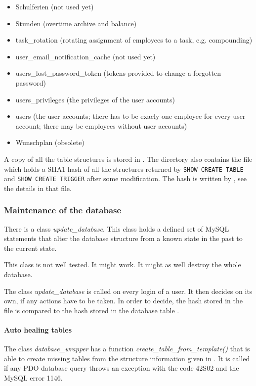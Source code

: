 \begin{itemize}
\item Schulferien (not used yet)
\item Stunden (overtime archive and balance)
\item task\_rotation (rotating assignment of employees to a task, e.g. compounding)
\item user\_email\_notification\_cache (not used yet)
\item users\_lost\_password\_token (tokens provided to change a forgotten password)
\item users\_privileges (the privileges of the user accounts)
\item users (the user accounts; there has to be exacly one employee for every user account; there may be employees without user accounts)
\item Wunschplan (obsolete)
\end{itemize}


A copy of all the table structures is stored in .
The directory also contains the file  which holds a SHA1 hash of all 
the structures returned by \verb|SHOW CREATE TABLE| and \verb|SHOW CREATE TRIGGER| after some modification. 
The hash is written by , see the details in that file.

\subsubsection{Maintenance of the database}
There is a class \emph{update\_database}.
This class holds a defined set of MySQL statements that alter the database structure from a known state in the past to the current state.

This class is not well tested. It might work. It might as well destroy the whole database.

The class \emph{update\_database} is called on every login of a user. It then decides on its own, if any actions have to be taken.
In order to decide, the hash stored in the file  is compared to the hash stored in the database table .
\paragraph{Auto healing tables}
The class \emph{database\_wrapper} has a function \emph{create\_table\_from\_template()} that is able to create missing tables from the structure information given in . It is called if any PDO database query throws an exception with the code 42S02 and the MySQL error 1146.
